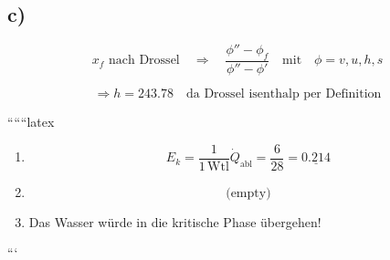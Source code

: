 

\subsection*{c)}

\[
x_f \text{ nach Drossel} \quad \Rightarrow \quad \frac{\phi'' - \phi_f}{\phi'' - \phi'} \quad \text{mit} \quad \phi = v, u, h, s
\]

\[
\Rightarrow h = 243.78 \quad \text{da Drossel isenthalp per Definition}
\]

``````latex


\begin{enumerate}
    \item 
    \[
    E_k = \frac{1}{1 \, \text{Wtl}} \dot{Q}_{\text{abl}} = \frac{6}{28} = \underline{0.214}
    \]
    
    \item 
    \[
    \text{(empty)}
    \]
    
    \item 
    Das Wasser würde in die kritische Phase übergehen!
\end{enumerate}

```